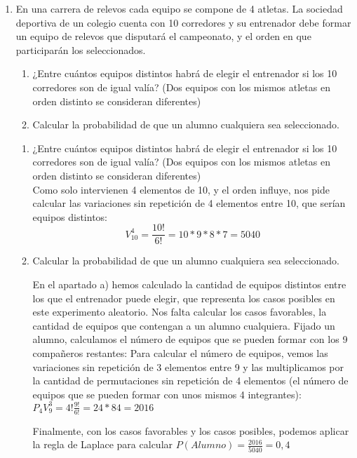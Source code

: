 \documentclass[a4paper,12pt]{article}
\begin{document}
\begin{enumerate}
    \item En una carrera de relevos cada equipo se compone de 4 atletas. La sociedad deportiva de un colegio cuenta con 10 corredores y su entrenador debe formar un equipo de relevos que disputará el campeonato, y el orden en que participarán los seleccionados.
    \begin{enumerate}[label=\alph*)]
    \item ¿Entre cuántos equipos distintos habrá de elegir el entrenador si los 10 corredores son de igual valía? (Dos equipos con los mismos atletas en orden distinto se consideran diferentes)
    \item Calcular la probabilidad de que un alumno cualquiera sea seleccionado.
    \end{enumerate}

    \begin{enumerate}[label=\alph*)]
    \item ¿Entre cuántos equipos distintos habrá de elegir el entrenador si los 10 corredores son de igual valía? (Dos equipos con los mismos atletas en orden distinto se consideran diferentes)\\

    Como solo intervienen 4 elementos de 10, y el orden influye, nos pide calcular las variaciones sin repetición de 4 elementos entre 10, que serían equipos distintos: $$V^4_{10} =\frac{10!}{6!} =10*9*8*7=5040$$ 
    
    \item Calcular la probabilidad de que un alumno cualquiera sea seleccionado.

    En el apartado a) hemos calculado la cantidad de equipos distintos entre los que el entrenador puede elegir, que representa los casos posibles en este experimento aleatorio. Nos falta calcular los casos favorables, la cantidad de equipos que contengan a un alumno cualquiera.
    Fijado un alumno, calculamos el número de equipos que se pueden formar con los 9 compañeros restantes:
    Para calcular el número de equipos, vemos las variaciones sin repetición de 3 elementos entre 9 y las multiplicamos por la cantidad de permutaciones sin repetición de 4 elementos (el número de equipos que se pueden formar con unos mismos 4 integrantes): $P_4V_9^3=4!\frac{9!}{6!}=24*84=2016$

    Finalmente, con los casos favorables y los casos posibles, podemos aplicar la regla de Laplace para calcular $P(Alumno)=\frac{2016}{5040}=0,4$
    
    \end{enumerate}
    

\end{enumerate}
\end{document}
